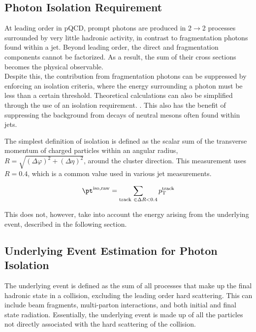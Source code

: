 
\subsection{Photon Isolation Requirement}
\label{sec:isolation}
At leading order in pQCD, prompt photons are produced in 2$\to$2 processes surrounded by very little hadronic activity, in contrast to fragmentation photons found within a jet. Beyond leading order, the direct and fragmentation components cannot be factorized. As a result, the sum of their cross sections becomes the physical observable.\\

Despite this, the contribution from fragmentation photons can be suppressed by enforcing an isolation criteria, where the energy surrounding a photon must be less than a certain threshold. 
Theoretical calculations can also be simplified through the use of an isolation requirement. \cite{PhysRevD.82.014015}. This also has the benefit of suppressing the background from decays of neutral mesons often found within jets.

The simplest definition of isolation is defined as the scalar sum of the transverse momentum of charged particles within an angular radius, $R =\sqrt{(\Delta\varphi)^{2} +(\Delta\eta)^{2}  }$, around the cluster direction. This measurement uses $R = 0.4$, which is a common value used in various jet measurements.

\begin{equation}
\pt^\mathrm{iso,raw} = \sum_{\mathrm{track}~\in\Delta R<0.4} p_{\mathrm{T}}^{\mathrm{track}}	
\end{equation}

This does not, however, take into account the energy arising from the underlying event, described in the following section.


\subsection{Underlying Event Estimation for Photon Isolation}
\label{sec:ue_isolation}
The underlying event is defined as the sum of all processes that make up the final hadronic state in a collision, excluding the leading order hard scattering. This can include beam fragments, multi-parton interactions, and both initial and final state radiation. Essentially, the underlying event is made up of all the particles not directly associated with the hard scattering of the collision.

